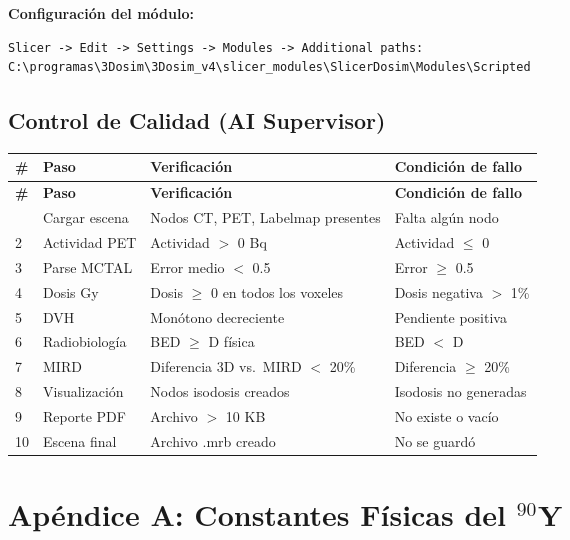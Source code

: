 \documentclass[12pt,a4paper]{article}
\begin{document}
\textbf{Configuración del módulo:}
\begin{lstlisting}
Slicer -> Edit -> Settings -> Modules -> Additional paths:
C:\programas\3Dosim\3Dosim_v4\slicer_modules\SlicerDosim\Modules\Scripted
\end{lstlisting}


\begin{tcolorbox}[aiSupervisor]
\subsection*{Control de Calidad (AI Supervisor)}

\begin{longtable}{p{0.5cm} p{4cm} p{4.5cm} p{5cm}}
\toprule
\textbf{\#} & \textbf{Paso} & \textbf{Verificación} & \textbf{Condición de fallo} \\
\midrule
\endfirsthead
\toprule
\textbf{\#} & \textbf{Paso} & \textbf{Verificación} & \textbf{Condición de fallo} \\
\midrule
\endhead
\bottomrule
\endfoot
1 & Cargar escena & Nodos CT, PET, Labelmap presentes & Falta algún nodo \\
2 & Actividad PET & Actividad $>$ 0 Bq & Actividad $\leq$ 0 \\
3 & Parse MCTAL & Error medio $<$ 0.5 & Error $\geq$ 0.5 \\
4 & Dosis Gy & Dosis $\geq$ 0 en todos los voxeles & Dosis negativa $>$ 1\% \\
5 & DVH & Monótono decreciente & Pendiente positiva \\
6 & Radiobiología & BED $\geq$ D física & BED $<$ D \\
7 & MIRD & Diferencia 3D vs.\ MIRD $<$ 20\% & Diferencia $\geq$ 20\% \\
8 & Visualización & Nodos isodosis creados & Isodosis no generadas \\
9 & Reporte PDF & Archivo $>$ 10 KB & No existe o vacío \\
10 & Escena final & Archivo .mrb creado & No se guardó \\
\end{longtable}

\newpage

\end{tcolorbox}
\section*{Apéndice A: Constantes Físicas del $^{90}$Y}
\end{document}
